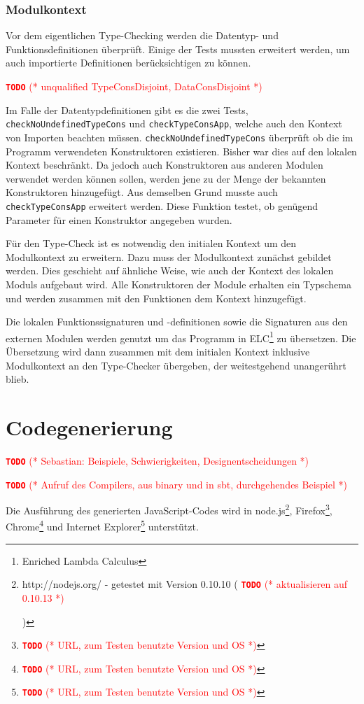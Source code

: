 \documentclass[runningheads]{llncs}
\newcommand{\TODO}[1]{ \textcolor{red}{\textbf{\texttt{\large{TODO}}} (* #1 *)}\par}
\begin{document}
\subsubsection{Modulkontext}

Vor dem eigentlichen Type-Checking werden die Datentyp- und Funktionsdefinitionen überprüft. Einige der Tests mussten erweitert werden, um auch importierte Definitionen berücksichtigen zu können.

\TODO{unqualified TypeConsDisjoint, DataConsDisjoint}

Im Falle der Datentypdefinitionen gibt es die zwei Tests, \verb|checkNoUndefinedTypeCons| und \verb|checkTypeConsApp|, welche auch den Kontext von Importen beachten müssen. \verb|checkNoUndefinedTypeCons| überprüft ob die im Programm verwendeten Konstruktoren existieren. Bisher war dies auf den lokalen Kontext beschränkt. Da jedoch auch Konstruktoren aus anderen Modulen verwendet werden können sollen, werden jene zu der Menge der bekannten Konstruktoren hinzugefügt. Aus demselben Grund musste auch \verb|checkTypeConsApp| erweitert werden. Diese Funktion testet, ob genügend Parameter für einen Konstruktor angegeben wurden.

Für den Type-Check ist es notwendig den initialen Kontext um den Modulkontext zu erweitern. Dazu muss der Modulkontext zunächst gebildet werden. Dies geschieht auf ähnliche Weise, wie auch der Kontext des lokalen Moduls aufgebaut wird. Alle Konstruktoren der Module erhalten ein Typschema und werden zusammen mit den Funktionen dem Kontext hinzugefügt.

Die lokalen Funktionssignaturen und -definitionen sowie die Signaturen aus den externen Modulen werden genutzt um das Programm in ELC\footnote{Enriched Lambda Calculus} zu übersetzen. Die Übersetzung wird dann zusammen mit dem initialen Kontext inklusive Modulkontext an den Type-Checker übergeben, der weitestgehend unangerührt blieb.

\section{Codegenerierung}\label{sec:codegen}

\TODO{Sebastian: Beispiele, Schwierigkeiten, Designentscheidungen}

\TODO{Aufruf des Compilers, aus binary und in sbt, durchgehendes Beispiel}

Die Ausführung des generierten JavaScript-Codes wird in
node.js\footnote{http://nodejs.org/ - getestet mit Version 0.10.10
(\TODO{aktualisieren auf 0.10.13})},
Firefox\footnote{\TODO{URL, zum Testen benutzte Version und OS}},
Chrome\footnote{\TODO{URL, zum Testen benutzte Version und OS}} und
Internet Explorer\footnote{\TODO{URL, zum Testen benutzte Version und OS}}
unterstützt.
\end{document}

